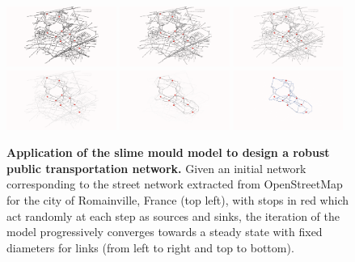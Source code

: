 \documentclass[runningheads,a4paper]{llncs2e/llncs}
\begin{document}
\begin{figure}[h!]
	\includegraphics[width=0.32\textwidth]{figures/slimemould_tick1.png}
	\includegraphics[width=0.32\textwidth]{figures/slimemould_tick10.png}
	\includegraphics[width=0.32\textwidth]{figures/slimemould_tick20.png}\\
	\includegraphics[width=0.32\textwidth]{figures/slimemould_tick50.png}
	\includegraphics[width=0.32\textwidth]{figures/slimemould_tick101.png}
	\includegraphics[width=0.32\textwidth]{figures/slimemould_reseauFinal.png}
	\caption{\textbf{Application of the slime mould model to design a robust public transportation network.} Given an initial network corresponding to the street network extracted from OpenStreetMap for the city of Romainville, France (top left), with stops in red which act randomly at each step as sources and sinks, the iteration of the model progressively converges towards a steady state with fixed diameters for links (from left to right and top to bottom).\label{fig:romainville}}
\end{figure}
\end{document}
